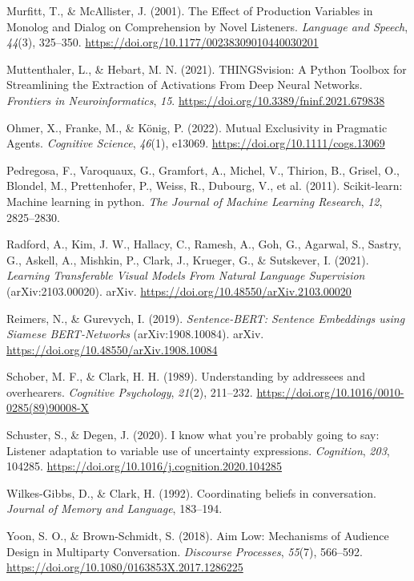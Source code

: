 \documentclass[10pt, letterpaper]{article}
\begin{document}
\begin{CSLReferences}{1}{0}
Murfitt, T., \& McAllister, J. (2001). The {Effect} of {Production
Variables} in {Monolog} and {Dialog} on {Comprehension} by {Novel
Listeners}. \emph{Language and Speech}, \emph{44}(3), 325--350.
\url{https://doi.org/10.1177/00238309010440030201}

Muttenthaler, L., \& Hebart, M. N. (2021). {THINGSvision}: {A Python
Toolbox} for {Streamlining} the {Extraction} of {Activations From Deep
Neural Networks}. \emph{Frontiers in Neuroinformatics}, \emph{15}.
\url{https://doi.org/10.3389/fninf.2021.679838}

Ohmer, X., Franke, M., \& König, P. (2022). Mutual {Exclusivity} in
{Pragmatic Agents}. \emph{Cognitive Science}, \emph{46}(1), e13069.
\url{https://doi.org/10.1111/cogs.13069}

Pedregosa, F., Varoquaux, G., Gramfort, A., Michel, V., Thirion, B.,
Grisel, O., Blondel, M., Prettenhofer, P., Weiss, R., Dubourg, V., et
al. (2011). Scikit-learn: {Machine} learning in python. \emph{The
Journal of Machine Learning Research}, \emph{12}, 2825--2830.

Radford, A., Kim, J. W., Hallacy, C., Ramesh, A., Goh, G., Agarwal, S.,
Sastry, G., Askell, A., Mishkin, P., Clark, J., Krueger, G., \&
Sutskever, I. (2021). \emph{Learning {Transferable Visual Models From
Natural Language Supervision}} (arXiv:2103.00020). arXiv.
\url{https://doi.org/10.48550/arXiv.2103.00020}

Reimers, N., \& Gurevych, I. (2019). \emph{Sentence-{BERT}: {Sentence
Embeddings} using {Siamese BERT-Networks}} (arXiv:1908.10084). arXiv.
\url{https://doi.org/10.48550/arXiv.1908.10084}

Schober, M. F., \& Clark, H. H. (1989). Understanding by addressees and
overhearers. \emph{Cognitive Psychology}, \emph{21}(2), 211--232.
\url{https://doi.org/10.1016/0010-0285(89)90008-X}

Schuster, S., \& Degen, J. (2020). I know what you're probably going to
say: {Listener} adaptation to variable use of uncertainty expressions.
\emph{Cognition}, \emph{203}, 104285.
\url{https://doi.org/10.1016/j.cognition.2020.104285}

Wilkes-Gibbs, D., \& Clark, H. (1992). Coordinating beliefs in
conversation. \emph{Journal of Memory and Language}, 183--194.

Yoon, S. O., \& Brown-Schmidt, S. (2018). Aim {Low}: {Mechanisms} of
{Audience Design} in {Multiparty Conversation}. \emph{Discourse
Processes}, \emph{55}(7), 566--592.
\url{https://doi.org/10.1080/0163853X.2017.1286225}

\end{CSLReferences}


\end{document}

